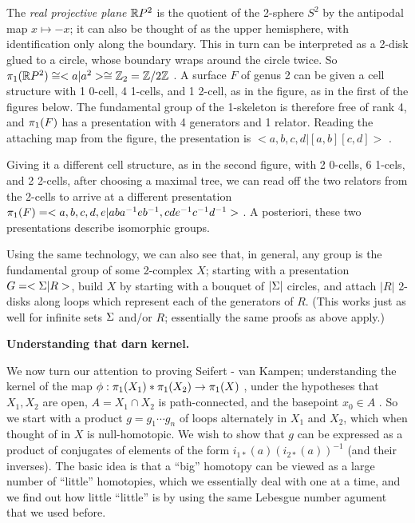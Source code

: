 The {\it real projective plane} ${\Bbb R}P^2$ is the quotient of 
the 2-sphere $S^2$ by the antipodal map $x\mapsto -x$; 
it can also be thought of as the upper hemisphere, with 
identification only along the boundary. This in turn can be 
interpreted as a 2-disk glued to a circle, whose boundary
wraps around the circle twice. So $\pi_1({\Bbb R}P^2)\cong 
<a | a^2>\cong {\Bbb Z}_2 = {\Bbb Z}/2{\Bbb Z}$ .
A surface $F$ of genus 2 can be given a cell structure with 1 0-cell,
4 1-cells, and 1 2-cell, as in the figure, as in the first of the 
figures below. The fundamental group
of the 1-skeleton is therefore free of rank 4, and $\pi_1(F)$ has
a presentation with 4 generators and 1 relator. Reading the attaching
map from the figure, the presentation is $<a,b,c,d | [a,b][c,d] >$ .

\msk



\leavevmode

\epsfxsize=5.6in

\msk

Giving it a different cell structure, as in the second figure, with 2 0-cells,
6 1-cels, and 2 2-cells, after choosing a maximal tree, we can read off the
two relators from the 2-cells to arrive at a different presentation
$\pi_1(F) = <a,b,c,d,e | aba^{-1}eb^{-1},cde^{-1}c^{-1}d^{-1}>$ . A posteriori,
these two presentations describe isomorphic groups.

\bsk

Using the same technology, we can also see that, in general, 
any group is the fundamental group of some 2-complex $X$;
starting with a presentation $G = <\Sigma | R>$, build $X$ by starting
with a bouquet of $|\Sigma|$ circles, and attach $|R|$ 2-disks along
loops which represent each of the generators of $R$. (This works just
as well for infinite sets $\Sigma$ and/or $R$; essentially the same proofs
as above apply.)

\bsk

{\bf Understanding that darn kernel.}

\msk

We now turn our attention to proving Seifert - van Kampen; understanding
the kernel of the map $\phi : \pi_1(X_1)*\pi_1(X_2)\rightarrow\pi_1(X)$ , 
under the hypotheses
that $X_1,X_2$ are open, $A=X_1\cap X_2$ is path-connected, and the
basepoint $x_0\in A$ . So we start with a product $g = g_1\cdots g_n$ 
of loops alternately in $X_1$ and $X_2$, which when thought of in $X$
is null-homotopic. We wish to show that $g$ can be expressed as a 
product of conjugates of elements of the form $i_{1*}(a)(i_{2*}(a))^{-1}$
(and their inverses). The basic idea is that a ``big'' homotopy can be
viewed as a large number of ``little'' homotopies, which
we essentially deal with one at a time, and we find out how
little ``little'' is by using the same Lebesgue number agument that we
used before.

